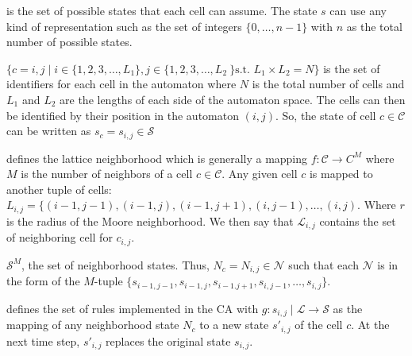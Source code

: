 \begin{CAdef}
    \itemS is the set of possible states that each cell can assume. The state $s$ can use any kind of representation such as the set of integers $\lbrace 0,\ldots,n-1\rbrace$ with $n$ as the total number of possible states.
    
    \itemC $\lbrace c = {i,j} \mid i \in \lbrace 1,2,3,\dots,L_1 \rbrace, j \in \lbrace 1,2,3,\dots,L_2\ \rbrace \text{s.t. } L_1 \times L_2 = N \rbrace$ is the set of identifiers for each cell in the automaton where $N$ is the total number of cells and $L_1$ and $L_2$ are the lengths of each side of the automaton space. The cells can then be identified by their position in the automaton $(i,j)$. So, the state of cell $c \in \mathcal{C}$ can be written as $s_c = s_{i,j} \in \mathcal{S}$
    
    \itemL defines the lattice neighborhood which is generally a mapping $f : \mathcal{C} \rightarrow C^M$ where $M$ is the number of neighbors of a cell $c \in \mathcal{C}$. Any given cell $c$ is mapped to another tuple of cells: $L_{i,j} = \lbrace (i-1,j-1), (i-1, j), (i-1, j+1), (i, j-1), \dots, (i,j)$. Where $r$ is the radius of the Moore neighborhood. We then say that $\mathcal{L}_{i,j}$ contains the set of neighboring cell for $c_{i,j}$.
    
    \itemN $\mathcal{S}^M$, the set of neighborhood states. Thus, $N_c = N_{i,j} \in \mathcal{N}$ such that each $\mathcal{N}$ is in the form of the $M$-tuple $\lbrace s_{i-1,j-1}, s_{i-1, j}, s_{i-1. j+1}, s_{i, j-1}, \dots, s_{i,j} \rbrace$.
    
    \itemR defines the set of rules implemented in the CA with $g : s_{i,j} \mid \mathcal{L} \rightarrow \mathcal{S}$ as the mapping of any neighborhood state $N_c$ to a new state $s'_{i,j}$ of the cell $c$. At the next time step, $s'_{i,j}$ replaces the original state $s_{i,j}$.
\end{CAdef}




